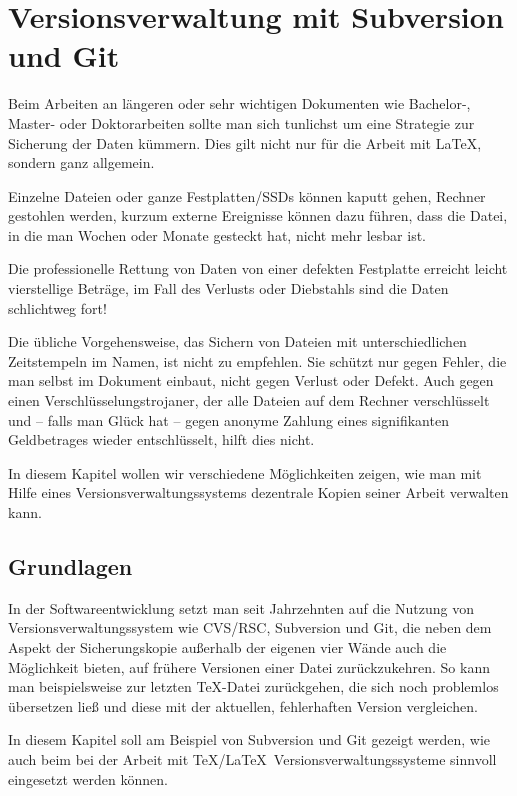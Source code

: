 \chapter{Versionsverwaltung mit Subversion und Git}

Beim Arbeiten an längeren oder sehr wichtigen Dokumenten wie Bachelor-, Master- oder Doktorarbeiten sollte man sich tunlichst um eine Strategie zur Sicherung der Daten kümmern. Dies gilt nicht nur für die Arbeit mit \LaTeX, sondern ganz allgemein. 

Einzelne Dateien oder ganze Festplatten/SSDs können kaputt gehen, Rechner gestohlen werden, kurzum externe Ereignisse können dazu führen, dass die Datei, in die man Wochen oder Monate gesteckt hat, nicht mehr lesbar ist. 

Die professionelle Rettung von Daten von einer defekten Festplatte erreicht leicht vierstellige Beträge, im Fall des Verlusts oder Diebstahls sind die Daten schlichtweg fort! 

Die übliche Vorgehensweise, das Sichern von Dateien mit unterschiedlichen Zeitstempeln im Namen, ist nicht zu empfehlen. Sie schützt nur gegen Fehler, die man selbst im Dokument einbaut, nicht gegen Verlust oder Defekt. Auch gegen einen Verschlüsselungstrojaner, der alle Dateien auf dem Rechner verschlüsselt und -- falls man Glück hat -- gegen anonyme Zahlung eines signifikanten Geldbetrages wieder entschlüsselt, hilft dies nicht.

In diesem Kapitel wollen wir verschiedene Möglichkeiten zeigen, wie man mit Hilfe eines Versionsverwaltungssystems dezentrale Kopien seiner Arbeit verwalten kann.

\section{Grundlagen}

In der Softwareentwicklung setzt man seit Jahrzehnten auf die Nutzung von Versionsverwaltungssystem wie CVS/RSC, Subversion und Git, die neben dem Aspekt der Sicherungskopie außerhalb der eigenen vier Wände auch die Möglichkeit bieten, auf frühere Versionen einer Datei zurückzukehren. So kann man beispielsweise zur letzten \TeX-Datei zurückgehen, die sich noch problemlos übersetzen ließ und diese mit der aktuellen, fehlerhaften Version vergleichen. 

In diesem Kapitel soll am Beispiel von Subversion und Git gezeigt werden, wie auch beim bei der Arbeit mit \TeX/\LaTeX\ Versionsverwaltungssysteme sinnvoll eingesetzt werden können.

